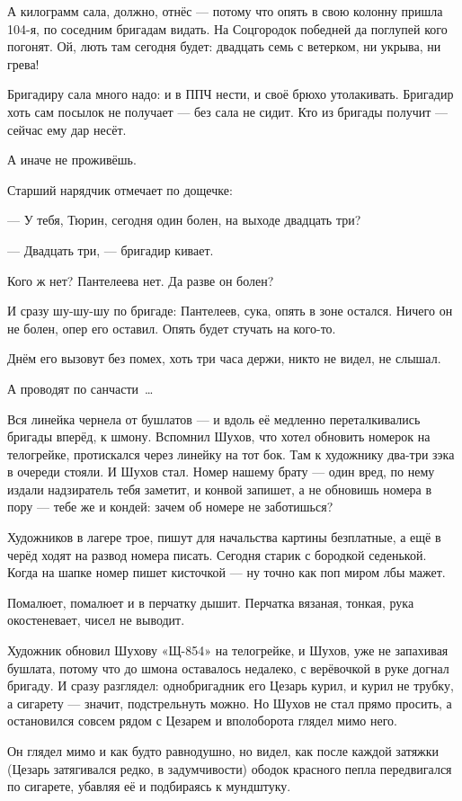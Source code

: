А килограмм сала, должно, отнёс --- потому что опять в свою колонну пришла 104-я, по соседним 
бригадам видать. На Соцгородок победней да поглупей кого погонят. Ой, лють там сегодня будет: 
двадцать семь с ветерком, ни укрыва, ни грева!

Бригадиру сала много надо: и в ППЧ нести, и своё брюхо утолакивать. Бригадир хоть сам посылок 
не получает --- без сала не сидит. Кто из бригады получит --- сейчас ему дар несёт.

А иначе не проживёшь.

Старший нарядчик отмечает по дощечке:

--- У тебя, Тюрин, сегодня один болен, на выходе двадцать три?

--- Двадцать три, --- бригадир кивает.

Кого ж нет? Пантелеева нет. Да разве он болен?

И сразу шу-шу-шу по бригаде: Пантелеев, сука, опять в зоне остался. Ничего он не болен, опер его 
оставил. Опять будет стучать на кого-то.

Днём его вызовут без помех, хоть три часа держи, никто не видел, не слышал.

А проводят по санчасти~\dots{}

Вся линейка чернела от бушлатов --- и вдоль её медленно переталкивались бригады вперёд, к 
шмону. Вспомнил Шухов, что хотел обновить номерок на телогрейке, протискался через линейку 
на тот бок. Там к художнику два-три зэка в очереди стояли. И Шухов стал. Номер нашему брату --- 
один вред, по нему издали надзиратель тебя заметит, и конвой запишет, а не обновишь номера в 
пору --- тебе же и кондей: зачем об номере не заботишься?

Художников в лагере трое, пишут для начальства картины безплатные, а ещё в черёд ходят на 
развод номера писать. Сегодня старик с бородкой седенькой. Когда на шапке номер пишет 
кисточкой --- ну точно как поп миром лбы мажет.

Помалюет, помалюет и в перчатку дышит. Перчатка вязаная, тонкая, рука окостеневает, чисел не 
выводит.

Художник обновил Шухову «Щ-854» на телогрейке, и Шухов, уже не запахивая бушлата, потому что до 
шмона оставалось недалеко, с верёвочкой в руке догнал бригаду. И сразу разглядел: 
однобригадник его Цезарь курил, и курил не трубку, а сигарету --- значит, подстрельнуть можно. 
Но Шухов не стал прямо просить, а остановился совсем рядом с Цезарем и вполоборота глядел 
мимо него.

Он глядел мимо и как будто равнодушно, но видел, как после каждой затяжки (Цезарь затягивался 
редко, в задумчивости) ободок красного пепла передвигался по сигарете, убавляя её и 
подбираясь к мундштуку.

